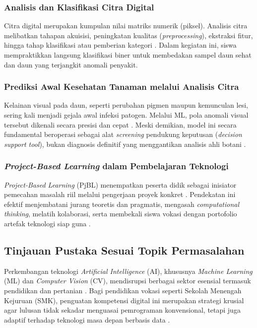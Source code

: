 \subsubsection{Analisis dan Klasifikasi Citra Digital}
Citra digital merupakan kumpulan nilai matriks numerik (piksel). Analisis citra melibatkan tahapan akuisisi, peningkatan kualitas (\textit{preprocessing}), ekstraksi fitur, hingga tahap klasifikasi atau pemberian kategori \parencite{Wibowo2026, Andriani2025}. Dalam kegiatan ini, siswa mempraktikkan langsung klasifikasi biner untuk membedakan sampel daun sehat dan daun yang terjangkit anomali penyakit.

\subsubsection{Prediksi Awal Kesehatan Tanaman melalui Analisis Citra}
Kelainan visual pada daun, seperti perubahan pigmen maupun kemunculan lesi, sering kali menjadi gejala awal infeksi patogen. Melalui ML, pola anomali visual tersebut dikenali secara presisi dan cepat \parencite{MarwanRamdhanyEdy2025}. Meski demikian, model ini secara fundamental beroperasi sebagai alat \textit{screening} pendukung keputusan (\textit{decision support tool}), bukan diagnosis definitif yang menggantikan analisis ahli botani \parencite{Imanulloh2023}.

\subsubsection{\textit{Project-Based Learning} dalam Pembelajaran Teknologi}
\textit{Project-Based Learning} (PjBL) menempatkan peserta didik sebagai inisiator pemecahan masalah riil melalui pengerjaan proyek konkret \parencite{Wahyudi2024}. Pendekatan ini efektif menjembatani jurang teoretis dan pragmatis, mengasah \textit{computational thinking}, melatih kolaborasi, serta membekali siswa vokasi dengan portofolio artefak teknologi siap guna \parencite{PANE2025, Ali2025}.

\subsection{Tinjauan Pustaka Sesuai Topik Permasalahan}

Perkembangan teknologi \textit{Artificial Intelligence} (AI), khususnya \textit{Machine Learning} (ML) dan \textit{Computer Vision} (CV), mendisrupsi berbagai sektor esensial termasuk pendidikan dan pertanian \parencite{Nadzinski2023}. Bagi pendidikan vokasi seperti Sekolah Menengah Kejuruan (SMK), penguatan kompetensi digital ini merupakan strategi krusial agar lulusan tidak sekadar menguasai pemrograman konvensional, tetapi juga adaptif terhadap teknologi masa depan berbasis data \parencite{Utomo2024, Andriani2025}.

